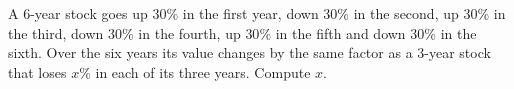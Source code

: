 A $6$-year stock goes up $30\%$ in the first year, down $30\%$ in the second, up $30\%$ in the third, down $30\%$ in the fourth, up $30\%$ in the fifth and down $30\%$ in the sixth. Over the six years its value changes by the same factor as a $3$-year stock that loses $x\%$ in each of its three years. Compute $x$.
